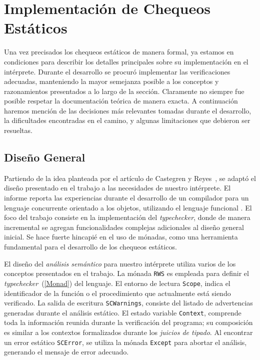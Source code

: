 \section{Implementación de Chequeos Estáticos}

Una vez precisados los chequeos estáticos de manera formal, ya estamos en condiciones para describir los detalles principales sobre su implementación en el intérprete.
Durante el desarrollo se procuró implementar las verificaciones adecuadas, manteniendo la mayor semejanza posible a los conceptos y razonamientos presentados a lo largo de la sección.
Claramente no siempre fue posible respetar la documentación teórica de manera exacta.
A continuación haremos mención de las decisiones más relevantes tomadas durante el desarrollo, la dificultades encontradas en el camino, y algunas limitaciones que debieron ser resueltas.

\subsection{Diseño General}

Partiendo de la idea planteada por el artículo de Castegren y Reyes~\cite{MonadicTC}, se adaptó el diseño presentado en el trabajo a las necesidades de nuestro intérprete.
El informe reporta las experiencias durante el desarrollo de un compilador para un lenguaje concurrente orientado a los objetos, utilizando el lenguaje funcional \Haskell{}.
El foco del trabajo consiste en la implementación del \textit{typechecker}, donde de manera incremental se agregan funcionalidades complejas adicionales al diseño general inicial.
Se hace fuerte hincapié en el uso de mónadas, como una herramienta fundamental para el desarrollo de los chequeos estáticos.


El diseño del \textit{análisis semántico} para nuestro intérprete utiliza varios de los conceptos presentados en el trabajo.
La mónada \lstinline[style = haskell]{RWS} es empleada para definir el \textit{typechecker}~(\ref{Monad}) del lenguaje.
El entorno de lectura \lstinline[style = haskell]{Scope}, indica el identificador de la función o el procedimiento que actualmente está siendo verificado.
La salida de escritura \lstinline[style = haskell]{SCWarnings}, consiste del listado de advertencias generadas durante el análisis estático.
El estado variable \lstinline[style = haskell]{Context}, comprende toda la información reunida durante la verificación del programa; su composición es similar a los contextos formalizados durante los \textit{juicios de tipado}.
Al encontrar un error estático \lstinline[style = haskell]{SCError}, se utiliza la mónada \lstinline[style = haskell]{Except} para abortar el análisis, generando el mensaje de error adecuado.

